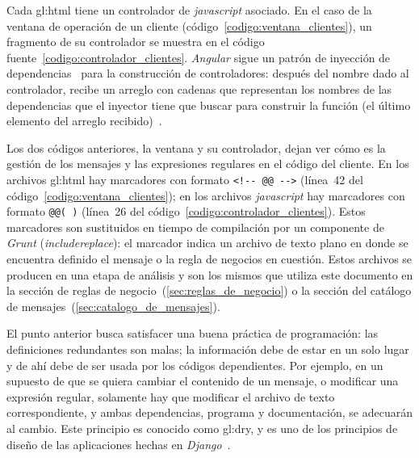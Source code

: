 
Cada \gls{gl:html} tiene un controlador de \textit{javascript} asociado. En el
caso de la ventana de operación de un cliente
(código~\ref{codigo:ventana_clientes}), un fragmento de su controlador se
muestra en el código fuente~\ref{codigo:controlador_clientes}. \textit{Angular}
sigue un patrón de inyección de dependencias~\cite{inyeccion_de_dependencias}
para la construcción de controladores: después del nombre dado al controlador,
recibe un arreglo con cadenas que representan los nombres de las dependencias
que el inyector tiene que buscar para construir la función (el último elemento
del arreglo recibido)~\cite{angular_inyector}.



Los dos códigos anteriores, la ventana y su controlador, dejan ver cómo es la
gestión de los mensajes y las expresiones regulares en el código del cliente.
En los archivos \gls{gl:html} hay marcadores con formato \verb|<!-- @@ -->|
(línea~42 del código~\ref{codigo:ventana_clientes}); en los archivos
\textit{javascript} hay marcadores con formato \verb|@@( )| (línea~26 del
código~\ref{codigo:controlador_clientes}). Estos marcadores son sustituidos en
tiempo de compilación por un componente de \textit{Grunt}
(\textit{includereplace}): el marcador indica un archivo de texto plano en
donde se encuentra definido el mensaje o la regla de negocios en cuestión. Estos
archivos se producen en una etapa de análisis y son los mismos que utiliza este
documento en la sección de reglas de negocio~(\ref{sec:reglas_de_negocio}) o la
sección del catálogo de mensajes~(\ref{sec:catalogo_de_mensajes}).

El punto anterior busca satisfacer una buena práctica de programación: las
definiciones redundantes son malas; la información debe de estar en un solo
lugar y de ahí debe de ser usada por los códigos dependientes. Por ejemplo,
en un supuesto de que se quiera cambiar el contenido de un mensaje, o modificar
una expresión regular, solamente hay que modificar el archivo de texto
correspondiente, y ambas dependencias, programa y documentación, se adecuarán
al cambio. Este principio es conocido como \gls{gl:dry}, y es uno de los
principios de diseño de las aplicaciones hechas en
\textit{Django}~\cite{django_principios_de_disenio}.

